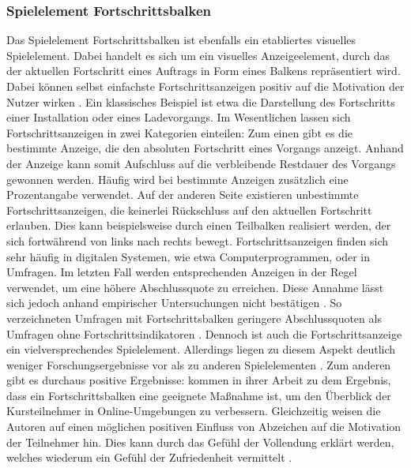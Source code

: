 \subsubsection{Spielelement Fortschrittsbalken}\label{progressbar}
Das Spielelement Fortschrittsbalken ist ebenfalls ein etabliertes visuelles Spielelement.
Dabei handelt es sich um ein visuelles Anzeigeelement, durch das der aktuellen Fortschritt eines Auftrags in Form eines Balkens repräsentiert wird. Dabei können selbst einfachste Fortschrittsanzeigen positiv auf die Motivation der Nutzer wirken \cite{mazarakis2018gamification}. Ein klassisches Beispiel ist etwa die Darstellung des Fortschritts einer Installation oder eines Ladevorgangs. Im Wesentlichen lassen sich Fortschrittsanzeigen in zwei Kategorien einteilen: Zum einen gibt es die bestimmte Anzeige, die den absoluten Fortschritt eines Vorgangs anzeigt. Anhand der Anzeige kann somit Aufschluss auf die verbleibende Restdauer des Vorgangs gewonnen werden. Häufig wird bei bestimmte Anzeigen zusätzlich eine Prozentangabe verwendet. Auf der anderen Seite existieren unbestimmte Fortschrittsanzeigen, die keinerlei Rückschluss auf den aktuellen Fortschritt erlauben. Dies kann beispielsweise durch einen Teilbalken realisiert werden, der sich fortwährend von links nach rechts bewegt. Fortschrittsanzeigen finden sich sehr häufig in digitalen Systemen, wie etwa Computerprogrammen, oder in Umfragen. Im letzten Fall werden entsprechenden Anzeigen in der Regel verwendet, um eine höhere Abschlussquote zu erreichen. Diese Annahme lässt sich jedoch anhand empirischer Untersuchungen nicht bestätigen \cite{Heerwegh}. So verzeichneten Umfragen mit Fortschrittsbalken geringere Abschlussquoten als Umfragen ohne Fortschrittsindikatoren \cite{liu_examining_2017}. Dennoch ist auch die Fortschrittsanzeige ein vielversprechendes Spielelement. Allerdings liegen zu diesem Aspekt deutlich  weniger Forschungsergebnisse vor als zu anderen Spielelementen \cite{koivisto_rise_2019}. Zum anderen gibt es durchaus positive Ergebnisse:  kommen in ihrer Arbeit zu dem Ergebnis, dass ein Fortschrittsbalken eine geeignete Maßnahme ist, um den Überblick der Kursteilnehmer in Online-Umgebungen zu verbessern. Gleichzeitig weisen die Autoren auf einen möglichen positiven Einfluss von Abzeichen auf die Motivation der Teilnehmer hin. Dies kann durch das Gefühl der Vollendung erklärt werden, welches wiederum ein Gefühl der Zufriedenheit vermittelt \cite{ryan_deci_2000}.

